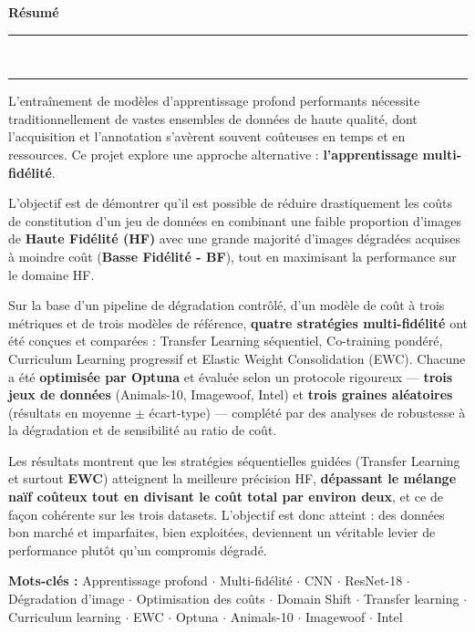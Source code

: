\documentclass[11pt,a4paper,openany]{book}
\begin{document}
\newpage

\thispagestyle{empty}
\vspace*{1.5cm}
{\color{primary}\LARGE\bfseries Résumé}\\[0.5em]
{\color{accent}\rule{\linewidth}{1.5pt}}\\[0.3em]
{\color{midgray}\rule{\linewidth}{0.4pt}}
\vspace{0.8em}

L'entraînement de modèles d'apprentissage profond performants nécessite traditionnellement de vastes ensembles de données de haute qualité, dont l'acquisition et l'annotation s'avèrent souvent coûteuses en temps et en ressources. Ce projet explore une approche alternative : \textbf{l'apprentissage multi-fidélité}.

L'objectif est de démontrer qu'il est possible de réduire drastiquement les coûts de constitution d'un jeu de données en combinant une faible proportion d'images de \textbf{Haute Fidélité (HF)} avec une grande majorité d'images dégradées acquises à moindre coût (\textbf{Basse Fidélité - BF}), tout en maximisant la performance sur le domaine HF.

Sur la base d'un pipeline de dégradation contrôlé, d'un modèle de coût à trois métriques et de trois modèles de référence, \textbf{quatre stratégies multi-fidélité} ont été conçues et comparées : Transfer Learning séquentiel, Co-training pondéré, Curriculum Learning progressif et Elastic Weight Consolidation (EWC). Chacune a été \textbf{optimisée par Optuna} et évaluée selon un protocole rigoureux — \textbf{trois jeux de données} (Animals-10, Imagewoof, Intel) et \textbf{trois graines aléatoires} (résultats en moyenne $\pm$ écart-type) — complété par des analyses de robustesse à la dégradation et de sensibilité au ratio de coût.

Les résultats montrent que les stratégies séquentielles guidées (Transfer Learning et surtout \textbf{EWC}) atteignent la meilleure précision HF, \textbf{dépassant le mélange naïf coûteux tout en divisant le coût total par environ deux}, et ce de façon cohérente sur les trois datasets. L'objectif est donc atteint : des données bon marché et imparfaites, bien exploitées, deviennent un véritable levier de performance plutôt qu'un compromis dégradé.

\vspace{1.5em}
\begin{tcolorbox}[
  enhanced,
  colback=white,
  colframe=midgray,
  arc=4pt,
  left=8pt,
  right=8pt,
  top=8pt,
  bottom=8pt,
  boxrule=0.8pt
]
\textbf{Mots-clés :} Apprentissage profond $\cdot$ Multi-fidélité $\cdot$ CNN $\cdot$ ResNet-18 $\cdot$
Dégradation d'image $\cdot$ Optimisation des coûts $\cdot$ Domain Shift $\cdot$
Transfer learning $\cdot$ Curriculum learning $\cdot$ EWC $\cdot$ Optuna $\cdot$
Animals-10 $\cdot$ Imagewoof $\cdot$ Intel
\end{tcolorbox}
\end{document}
